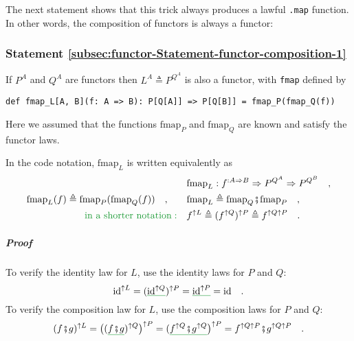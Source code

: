 The next statement shows that this trick always produces a lawful
\lstinline!.map! function. In other words, the composition
of functors is always a functor:

\subsubsection{Statement \label{subsec:functor-Statement-functor-composition-1}\ref{subsec:functor-Statement-functor-composition-1}}

If $P^{A}$ and $Q^{A}$ are functors then $L^{A}\triangleq P^{Q^{A}}$
is also a functor, with \lstinline!fmap! defined by
\begin{lstlisting}
def fmap_L[A, B](f: A => B): P[Q[A]] => P[Q[B]] = fmap_P(fmap_Q(f))
\end{lstlisting}
Here we assumed that the functions $\text{fmap}_{P}$ and $\text{fmap}_{Q}$
are known and satisfy the functor laws.

In the code notation, $\text{fmap}_{L}$ is written equivalently as
\begin{align*}
 & \text{fmap}_{L}:f^{:A\Rightarrow B}\Rightarrow P^{Q^{A}}\Rightarrow P^{Q^{B}}\quad,\\
\text{fmap}_{L}(f)\triangleq\text{fmap}_{P}(\text{fmap}_{Q}(f))\quad,\quad\quad & \text{fmap}_{L}\triangleq\text{fmap}_{Q}\bef\text{fmap}_{P}\quad,\\
{\color{greenunder}\text{in a shorter notation}:}\quad & f^{\uparrow L}\triangleq(f^{\uparrow Q})^{\uparrow P}\triangleq f^{\uparrow Q\uparrow P}\quad.
\end{align*}


\subparagraph{Proof}

To verify the identity law for $L$, use the identity laws for $P$
and $Q$:
\[
\text{id}^{\uparrow L}=(\gunderline{\text{id}^{\uparrow Q}})^{\uparrow P}=\gunderline{\text{id}^{\uparrow P}}=\text{id}\quad.
\]
To verify the composition law for $L$, use the composition laws for
$P$ and $Q$:
\[
(f\bef g)^{\uparrow L}=\big((\gunderline{f\bef g})^{\uparrow Q}\big)^{\uparrow P}=(\gunderline{f^{\uparrow Q}\bef g^{\uparrow Q}}\big)^{\uparrow P}=f^{\uparrow Q\uparrow P}\bef g^{\uparrow Q\uparrow P}\quad.
\]

